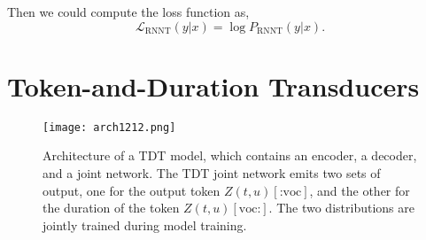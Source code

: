 \documentclass{article}
\begin{document}
Then we could compute the loss function as,
\begin{equation}
    \mathcal{L}_\text{RNNT}(y | x) = \log P_\text{RNNT}(y | x).
\end{equation}





 \section{Token-and-Duration Transducers}\label{tdt}
 
 \begin{figure}[t]
    \centering
    \texttt{[image: arch1212.png]}
    \caption{Architecture of a TDT model, which contains an encoder, a decoder, and a joint network. The TDT joint network emits two sets of output, one for the output token $Z(t,u)[\text{:voc}]$, and the other for the duration of the token  $Z(t,u)[\text{voc:}]$. The two distributions are jointly trained during model training.}
    \label{new_arch}
\end{figure}
\end{document}
